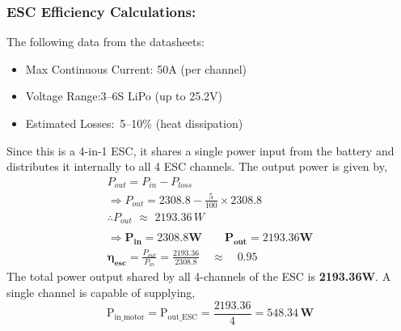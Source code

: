 \documentclass[12pt]{report}
\begin{document}
      \subsubsection{\large ESC Efficiency Calculations:}
      The following data from the datasheets:
      \begin{itemize}
        \item Max Continuous Current:	\hfill50A (per channel)
        \item Voltage Range:\hfill	3–6S LiPo (up to 25.2V)
        \item Estimated Losses:\hfill	~5–10\% (heat dissipation)
      \end{itemize}
      Since this is a 4-in-1 ESC, it shares a single power input from the battery and distributes it internally to all 4 ESC channels. The output power is given by,
      \begin{gather*} 
        P_{out} = P_{in} - P_{loss}\\
        \Rightarrow P_{out} = 2308.8 - \frac{5}{100} \times 2308.8 \\
        \therefore P_{out} \,\, \approx \,\, 2193.36 \, W \\ \\
        \Rightarrow \boldsymbol{P_{in} = 2308.8W} \quad \quad \boldsymbol{P_{out} = 2193.36W} \\ 
        \boldsymbol{\eta_{esc}} = \frac{P_{out}}{P_{in}} = \frac{2193.36}{2308.8} \quad \approx \quad \boldsymbol{0.95}
      \end{gather*}
      The total power output shared by all 4-channels of the ESC is \textbf{2193.36W}. A single channel is capable of supplying, \[ \mathrm{P_{in\_motor}} = \mathrm{P_{out\_ESC}} = \frac{2193.36}{4} = \boldsymbol{548.34 \, \text{W}} \]
  
\end{document}
